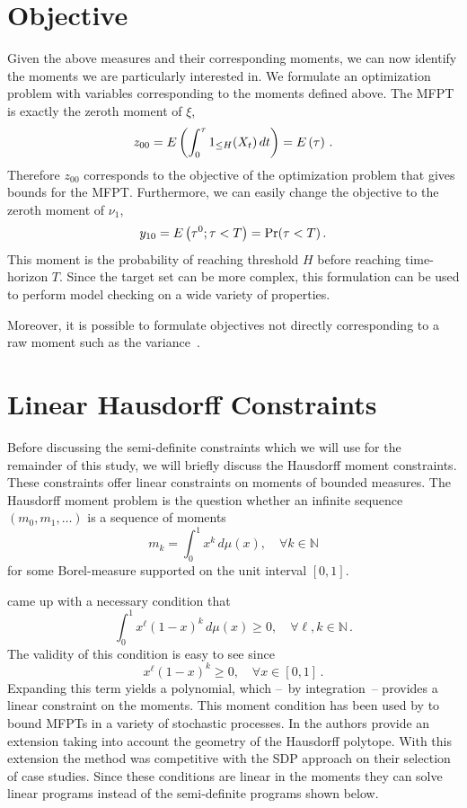 \section{Objective}
Given the above measures and their corresponding moments, we can
now identify the moments we are particularly interested in.
We formulate an optimization problem with variables corresponding 
to the moments defined above.
The \ac{MFPT} is exactly the zeroth moment of $\xi$,
\[
	z_{00}={E}\left(\int_0^{\tau}1_{\leq H}(X_t)\,dt\right) = {E}\left(\tau\right)\,.
\]
Therefore $z_{00}$ corresponds to the objective of the optimization problem
that gives bounds for the \ac{MFPT}.
Furthermore, we can easily change the objective to the  
zeroth moment of $\nu_1$,
\[
	y_{10} = {E}\left(\tau^0;\tau<T\right)=\Pr(\tau < T)\,.
\]
This moment is the probability of reaching
threshold $H$ before reaching time-horizon $T$. Since the target set can be more complex, this formulation can be used to perform model checking on a
wide variety of properties.

Moreover, it is possible to formulate objectives not directly corresponding to
a raw moment such as the variance~\parencite{sakurai2019bounding,dowdy2018bounds}.

\section{Linear Hausdorff Constraints}
Before discussing the semi-definite constraints which we will use for the remainder of this study, we will briefly discuss the Hausdorff moment constraints.
These constraints offer linear constraints on moments of bounded measures.
The Hausdorff moment problem is the question whether an infinite sequence $(m_0, m_1, \dotsc)$ is a sequence of moments
\[
	m_k = \int_{0}^{1} x^k\,d\mu(x), \quad \forall k\in\mathbb{N}
\]
for some Borel-measure supported on the unit interval $[0,1]$.

\citet{hausdorff} came up with a necessary condition that
\begin{equation}\label{eq:hausdorff}
    \int_0^1 x^\ell(1-x)^k\,d\mu(x) \geq 0, \quad \forall \ell, k\in\mathbb{N}\,.
\end{equation}
The validity of this condition is easy to see since
\begin{equation}\label{eq:hausdorff_integrand}
	x^\ell(1-x)^k\geq 0, \quad \forall x\in[0,1]\,.
\end{equation}
Expanding this term yields a polynomial, which --~by integration~-- provides a linear constraint on the moments.
This moment condition has been used by \citet{helmes2001computing} to bound \acp{MFPT} in a variety of stochastic processes.
In \citet{helmes2008geometrical} the authors provide an extension taking into account the geometry of the Hausdorff polytope.
With this extension the method was competitive with the \ac{SDP} approach on their selection of case studies.
Since these conditions are linear in the moments they can solve linear programs instead of the semi-definite programs shown below.

